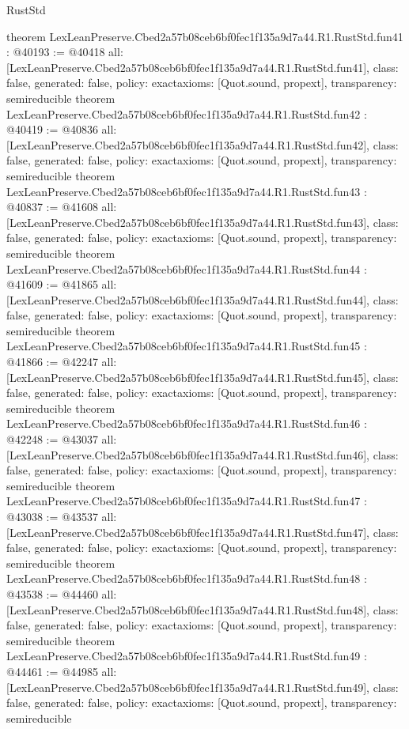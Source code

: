 \begin{lexlean}{RustStd}
\begin{coremodule}
{}
theorem LexLeanPreserve.Cbed2a57b08ceb6bf0fec1f135a9d7a44.R1.RustStd.fun41 : @40193 := @40418 {
  all: [LexLeanPreserve.Cbed2a57b08ceb6bf0fec1f135a9d7a44.R1.RustStd.fun41],
  class: false,
  generated: false,
  policy: exact{axioms: [Quot.sound, propext]},
  transparency: semireducible
}
theorem LexLeanPreserve.Cbed2a57b08ceb6bf0fec1f135a9d7a44.R1.RustStd.fun42 : @40419 := @40836 {
  all: [LexLeanPreserve.Cbed2a57b08ceb6bf0fec1f135a9d7a44.R1.RustStd.fun42],
  class: false,
  generated: false,
  policy: exact{axioms: [Quot.sound, propext]},
  transparency: semireducible
}
theorem LexLeanPreserve.Cbed2a57b08ceb6bf0fec1f135a9d7a44.R1.RustStd.fun43 : @40837 := @41608 {
  all: [LexLeanPreserve.Cbed2a57b08ceb6bf0fec1f135a9d7a44.R1.RustStd.fun43],
  class: false,
  generated: false,
  policy: exact{axioms: [Quot.sound, propext]},
  transparency: semireducible
}
theorem LexLeanPreserve.Cbed2a57b08ceb6bf0fec1f135a9d7a44.R1.RustStd.fun44 : @41609 := @41865 {
  all: [LexLeanPreserve.Cbed2a57b08ceb6bf0fec1f135a9d7a44.R1.RustStd.fun44],
  class: false,
  generated: false,
  policy: exact{axioms: [Quot.sound, propext]},
  transparency: semireducible
}
theorem LexLeanPreserve.Cbed2a57b08ceb6bf0fec1f135a9d7a44.R1.RustStd.fun45 : @41866 := @42247 {
  all: [LexLeanPreserve.Cbed2a57b08ceb6bf0fec1f135a9d7a44.R1.RustStd.fun45],
  class: false,
  generated: false,
  policy: exact{axioms: [Quot.sound, propext]},
  transparency: semireducible
}
theorem LexLeanPreserve.Cbed2a57b08ceb6bf0fec1f135a9d7a44.R1.RustStd.fun46 : @42248 := @43037 {
  all: [LexLeanPreserve.Cbed2a57b08ceb6bf0fec1f135a9d7a44.R1.RustStd.fun46],
  class: false,
  generated: false,
  policy: exact{axioms: [Quot.sound, propext]},
  transparency: semireducible
}
theorem LexLeanPreserve.Cbed2a57b08ceb6bf0fec1f135a9d7a44.R1.RustStd.fun47 : @43038 := @43537 {
  all: [LexLeanPreserve.Cbed2a57b08ceb6bf0fec1f135a9d7a44.R1.RustStd.fun47],
  class: false,
  generated: false,
  policy: exact{axioms: [Quot.sound, propext]},
  transparency: semireducible
}
theorem LexLeanPreserve.Cbed2a57b08ceb6bf0fec1f135a9d7a44.R1.RustStd.fun48 : @43538 := @44460 {
  all: [LexLeanPreserve.Cbed2a57b08ceb6bf0fec1f135a9d7a44.R1.RustStd.fun48],
  class: false,
  generated: false,
  policy: exact{axioms: [Quot.sound, propext]},
  transparency: semireducible
}
theorem LexLeanPreserve.Cbed2a57b08ceb6bf0fec1f135a9d7a44.R1.RustStd.fun49 : @44461 := @44985 {
  all: [LexLeanPreserve.Cbed2a57b08ceb6bf0fec1f135a9d7a44.R1.RustStd.fun49],
  class: false,
  generated: false,
  policy: exact{axioms: [Quot.sound, propext]},
  transparency: semireducible
}
\end{coremodule}
\end{lexlean}
